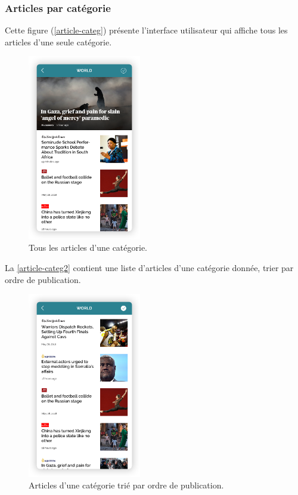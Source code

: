 \subsubsection{Articles par catégorie}
Cette figure (\autoref{article-categ}) présente l'interface utilisateur qui affiche tous les articles d'une seule catégorie. 
\begin{figure}[H]
    \centering
    \includegraphics[width=140pt]{img/chapter4/feedny/en-categ-articles1.png}
    \caption{Tous les articles d'une catégorie.}
    \label{article-categ}
\end{figure}

La \autoref{article-categ2} contient une liste d'articles d'une catégorie donnée, trier par ordre de publication.
\begin{figure}[H]
    \centering
    \includegraphics[width=140pt]{img/chapter4/feedny/en-categ-articles.png}
    \caption{Articles d'une catégorie trié par ordre de publication.}
    \label{article-categ2}
\end{figure}



